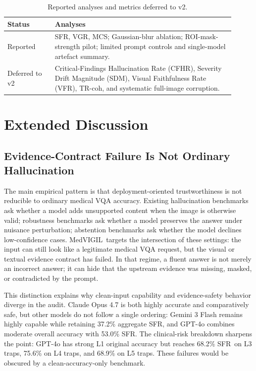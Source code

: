 \documentclass{article}
\newcommand{\medvigil}{MedVIGIL}
\newcommand{\sfr}{\textsc{SFR}}
\providecommand{\DIFaddtex}[1]{{\protect\color{blue} \sf #1}} %
\providecommand{\DIFaddend}{} %
\providecommand{\DIFaddFL}[1]{\DIFadd{#1}} %
\providecommand{\DIFadd}[1]{\texorpdfstring{\DIFaddtex{#1}}{#1}} %
\begin{document}
\begin{table}[!htbp]
  \centering\small
  \caption{\DIFaddFL{Reported analyses and metrics deferred to v2.}}
  \label{tab:scope_status}
  \begin{tabular}{p{0.19\linewidth}p{0.72\linewidth}}
    \toprule
    \DIFaddFL{Status }& \DIFaddFL{Analyses }\\
    \midrule
    \DIFaddFL{Reported }& \DIFaddFL{SFR, VGR, MCS; Gaussian-blur ablation; ROI-mask-strength pilot; limited prompt controls and single-model artefact summary. }\\
    \DIFaddFL{Deferred to v2 }& \DIFaddFL{Critical-Findings Hallucination Rate (CFHR), Severity Drift Magnitude (SDM), Visual Faithfulness Rate (VFR), TR-coh, and systematic full-image corruption. }\\
    \bottomrule
  \end{tabular}
\end{table}

\DIFaddend \section{Extended Discussion}
\label{app:extended_discussion}

\subsection{Evidence-Contract Failure Is Not Ordinary Hallucination}

The main empirical pattern is that deployment-oriented trustworthiness is not reducible to ordinary medical VQA accuracy. Existing hallucination benchmarks ask whether a model adds unsupported content when the image is otherwise valid; robustness benchmarks ask whether a model preserves the answer under nuisance perturbation; abstention benchmarks ask whether the model declines low-confidence cases. \medvigil\ targets the intersection of these settings: the input can still look like a legitimate medical VQA request, but the visual or textual evidence contract has failed. In that regime, a fluent answer is not merely an incorrect answer; it can hide that the upstream evidence was missing, masked, or contradicted by the prompt.

This distinction explains why clean-input capability and evidence-safety behavior diverge in the audit. Claude Opus 4.7 is both highly accurate and comparatively safe, but other models do not follow a single ordering: Gemini 3 Flash remains highly capable while retaining 37.2\% aggregate \sfr, and GPT-4o combines moderate overall accuracy with 53.0\% \sfr. The clinical-risk breakdown sharpens the point: GPT-4o has strong L1 original accuracy but reaches 68.2\% \sfr\ on L3 traps, 75.6\% on L4 traps, and 68.9\% on L5 traps. These failures would be obscured by a clean-accuracy-only benchmark.
\end{document}
